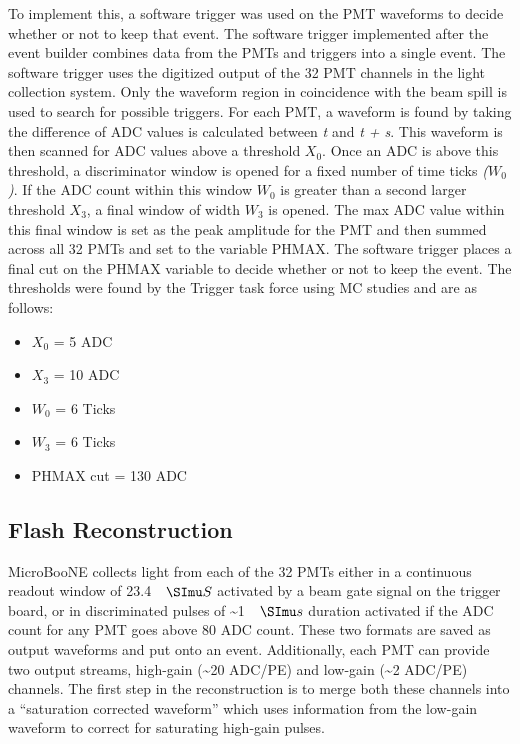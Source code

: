 To implement this, a software trigger was used on the PMT waveforms to decide whether or not to keep that event. The software trigger implemented after the event builder combines data from the PMTs and triggers into a single event. The software trigger uses the digitized output of the 32 PMT channels in the light collection system. Only the waveform region in coincidence with the beam spill is used to search for possible triggers. For each PMT, a waveform is found by taking the difference of ADC values is calculated between \textit{t} and \textit{t + s}. This waveform is then scanned for ADC values above a threshold \textit{$X_0$}. Once an ADC is above this threshold, a discriminator window is opened for a fixed number of time ticks \textit{($W_0$)}. If the ADC count within this window \textit{$W_0$} is greater than a second larger threshold \textit{$X_3$}, a final window of width \textit{$W_3$} is opened. The max ADC value within this final window is set as the peak amplitude for the PMT and then summed across all 32 PMTs and set to the variable PHMAX. The software trigger places a final cut on the PHMAX variable to decide whether or not to keep the event. The thresholds were found by the Trigger task force using MC studies and are as follows: 
\begin{itemize}
\item{$X_0$ = 5 ADC} 
\item{$X_3$ = 10 ADC} 
\item{$W_0$ = 6 Ticks} 
\item{$W_3$ = 6 Ticks} 
\item{PHMAX cut = 130 ADC}
\end{itemize}

\subsection{Flash Reconstruction}
MicroBooNE collects light from each of the 32 PMTs either in a continuous readout window of 23.4 $\micro S$ activated by a beam gate signal on the trigger board, or in discriminated pulses of \sim 1 $\micro s$ duration activated if the ADC count for any PMT goes above 80 ADC count. These two formats are saved as output waveforms and put onto an event. Additionally, each PMT can provide two output streams, high-gain (\sim 20 ADC/PE) and low-gain (\sim 2 ADC/PE) channels. The first step in the reconstruction is to merge both these channels into a ``saturation corrected waveform'' which uses information from the low-gain waveform to correct for saturating high-gain pulses.
 
